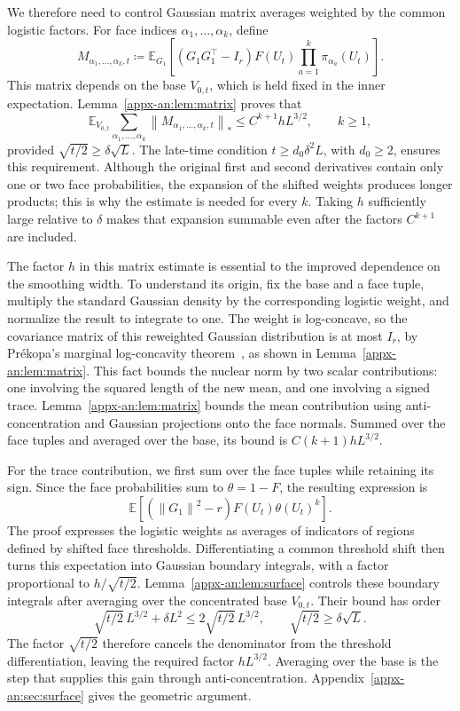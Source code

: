 \documentclass[11pt,letterpaper]{article}
\theoremstyle{remark}
\newcommand{\E}{\mathbb E}
\newcommand{\norm}[1]{\left\lVert#1\right\rVert}
\begin{document}
We therefore need to control Gaussian matrix averages weighted by
the common logistic factors. For face indices
\(\alpha_1,\ldots,\alpha_k\), define
\[
 M_{\alpha_1,\ldots,\alpha_k,t}\coloneqq
 \E_{G_1}\!\left[
 (G_1G_1^\top-I_r)F(U_t)\prod_{a=1}^k\pi_{\alpha_a}(U_t)
 \right].
\]
This matrix depends on the base \(V_{0,t}\), which is held fixed in
the inner expectation. Lemma~\ref{appx-an:lem:matrix} proves that
\[
 \E_{V_{0,t}}\sum_{\alpha_1,\ldots,\alpha_k}
 \norm{M_{\alpha_1,\ldots,\alpha_k,t}}_*
 \le C^{k+1}hL^{3/2},\qquad k\ge1,
\]
provided \(\sqrt{t/2}\ge\delta\sqrt L\). The late-time condition
\(t\ge d_0\delta^2L\), with \(d_0\ge2\), ensures this requirement.
Although the original first and second derivatives contain only
one or two face probabilities, the expansion of the shifted weights
produces longer products; this is why the estimate is needed for
every \(k\). Taking \(h\) sufficiently large relative to \(\delta\)
makes that expansion summable even after the factors \(C^{k+1}\)
are included.

The factor \(h\) in this matrix estimate is essential to the improved
dependence on the smoothing width. To understand its origin, fix the
base and a face tuple, multiply the standard Gaussian density by the
corresponding logistic weight, and normalize the result to integrate
to one. The weight is log-concave, so the covariance matrix of this
reweighted Gaussian distribution is at most \(I_r\), by
Pr\'ekopa's marginal log-concavity theorem~\cite[Theorem~6]{Prekopa1973},
as shown in Lemma~\ref{appx-an:lem:matrix}. This fact bounds
the nuclear norm by two scalar contributions: one involving the
squared length of the new mean, and one involving a signed trace.
Lemma~\ref{appx-an:lem:matrix} bounds the mean contribution using
anti-concentration and Gaussian projections onto the face normals.
Summed over the face tuples and averaged over the base, its bound
is \(C(k+1)hL^{3/2}\).

For the trace contribution, we first sum over the face tuples while
retaining its sign. Since the face probabilities sum to
\(\theta=1-F\), the resulting expression is
\[
 \E\!\left[(\norm{G_1}^2-r)F(U_t)\theta(U_t)^k\right].
\]
The proof expresses the logistic weights as averages of indicators
of regions defined by shifted face thresholds. Differentiating a
common threshold shift then turns this expectation into Gaussian
boundary integrals, with a factor proportional to \(h/\sqrt{t/2}\).
Lemma~\ref{appx-an:lem:surface} controls these boundary integrals
after averaging over the concentrated base \(V_{0,t}\). Their bound
has order
\[
 \sqrt{t/2}\,L^{3/2}+\delta L^2
 \le2\sqrt{t/2}\,L^{3/2},
 \qquad\sqrt{t/2}\ge\delta\sqrt L.
\]
The factor \(\sqrt{t/2}\) therefore cancels the denominator from
the threshold differentiation, leaving the required factor
\(hL^{3/2}\). Averaging over the base is the step that supplies this
gain through anti-concentration.
Appendix~\ref{appx-an:sec:surface} gives the geometric argument.
\end{document}
